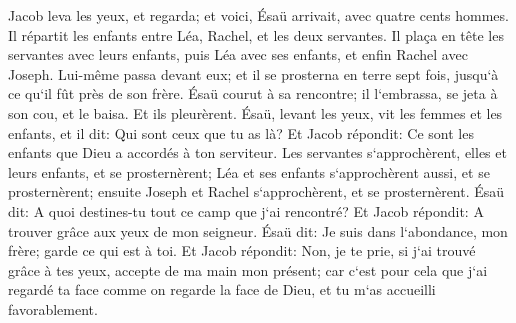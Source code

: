 \verse Jacob leva les yeux, et regarda; et voici, Ésaü arrivait, avec quatre cents hommes. Il répartit les enfants entre Léa, Rachel, et les deux servantes. 
\verse Il plaça en tête les servantes avec leurs enfants, puis Léa avec ses enfants, et enfin Rachel avec Joseph. 
\verse Lui-même passa devant eux; et il se prosterna en terre sept fois, jusqu`à ce qu`il fût près de son frère. 
\verse Ésaü courut à sa rencontre; il l`embrassa, se jeta à son cou, et le baisa. Et ils pleurèrent. 
\verse Ésaü, levant les yeux, vit les femmes et les enfants, et il dit: Qui sont ceux que tu as là? Et Jacob répondit: Ce sont les enfants que Dieu a accordés à ton serviteur. 
\verse Les servantes s`approchèrent, elles et leurs enfants, et se prosternèrent; 
\verse Léa et ses enfants s`approchèrent aussi, et se prosternèrent; ensuite Joseph et Rachel s`approchèrent, et se prosternèrent. 
\verse Ésaü dit: A quoi destines-tu tout ce camp que j`ai rencontré? Et Jacob répondit: A trouver grâce aux yeux de mon seigneur. 
\verse Ésaü dit: Je suis dans l`abondance, mon frère; garde ce qui est à toi. 
\verse Et Jacob répondit: Non, je te prie, si j`ai trouvé grâce à tes yeux, accepte de ma main mon présent; car c`est pour cela que j`ai regardé ta face comme on regarde la face de Dieu, et tu m`as accueilli favorablement. 
